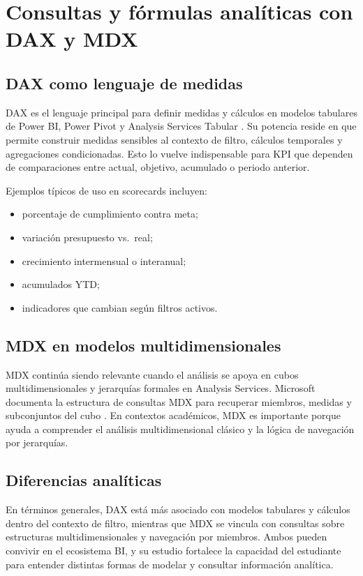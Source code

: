 \documentclass[12pt]{article}
\begin{document}
\section{Consultas y fórmulas analíticas con DAX y MDX}
\subsection{DAX como lenguaje de medidas}
DAX es el lenguaje principal para definir medidas y cálculos en modelos tabulares de Power BI, Power Pivot y Analysis Services Tabular \cite{ms_dax_overview}. Su potencia reside en que permite construir medidas sensibles al contexto de filtro, cálculos temporales y agregaciones condicionadas. Esto lo vuelve indispensable para KPI que dependen de comparaciones entre actual, objetivo, acumulado o periodo anterior.

Ejemplos típicos de uso en scorecards incluyen:
\begin{itemize}[leftmargin=*]
\item porcentaje de cumplimiento contra meta;
\item variación presupuesto vs.\ real;
\item crecimiento intermensual o interanual;
\item acumulados YTD;
\item indicadores que cambian según filtros activos.
\end{itemize}

\subsection{MDX en modelos multidimensionales}
MDX continúa siendo relevante cuando el análisis se apoya en cubos multidimensionales y jerarquías formales en Analysis Services. Microsoft documenta la estructura de consultas MDX para recuperar miembros, medidas y subconjuntos del cubo \cite{ms_mdx_basic_query}. En contextos académicos, MDX es importante porque ayuda a comprender el análisis multidimensional clásico y la lógica de navegación por jerarquías.

\subsection{Diferencias analíticas}
En términos generales, DAX está más asociado con modelos tabulares y cálculos dentro del contexto de filtro, mientras que MDX se vincula con consultas sobre estructuras multidimensionales y navegación por miembros. Ambos pueden convivir en el ecosistema BI, y su estudio fortalece la capacidad del estudiante para entender distintas formas de modelar y consultar información analítica.
\end{document}
